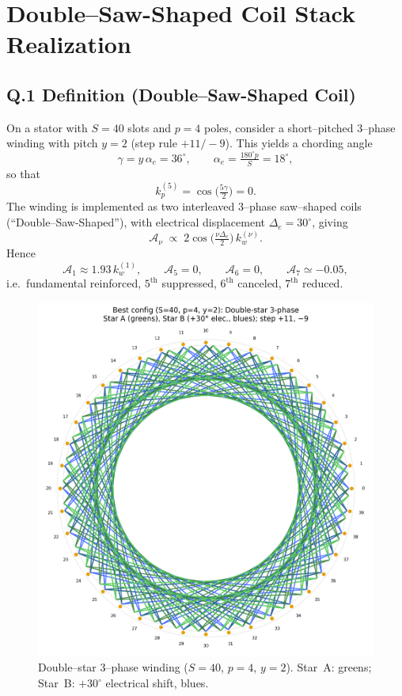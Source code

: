 \documentclass[12pt]{article}
\begin{document}
\section{Double--Saw-Shaped Coil Stack Realization}
    \label{sec:double-saw-stack}

    \subsection*{Q.1 Definition (Double--Saw-Shaped Coil)}
        On a stator with $S=40$ slots and $p=4$ poles, consider a short--pitched
        3--phase winding with pitch $y=2$ (step rule $+11/-9$).
        This yields a chording angle
        \[
            \gamma = y\,\alpha_e = 36^\circ,
            \qquad
            \alpha_e = \tfrac{180^\circ p}{S} = 18^\circ,
        \]
        so that
        \[
            k_p^{(5)}=\cos\!\big(\tfrac{5\gamma}{2}\big)=0.
        \]
        The winding is implemented as two interleaved 3--phase saw--shaped coils
        (``Double--Saw-Shaped''), with electrical displacement $\Delta_e=30^\circ$, giving
        \[
            \mathcal A_\nu \;\propto\;
            2\cos\!\Big(\tfrac{\nu\Delta_e}{2}\Big)\,k_w^{(\nu)}.
        \]
        Hence
        \[
            \mathcal A_1 \approx 1.93\,k_w^{(1)},\qquad
            \mathcal A_5=0,\qquad
            \mathcal A_6=0,\qquad
            \mathcal A_7\simeq -0.05,
        \]
        i.e.\ fundamental reinforced, $5^{\mathrm{th}}$ suppressed, $6^{\mathrm{th}}$ canceled,
        $7^{\mathrm{th}}$ reduced.

        \begin{figure}[htbp]
        \centering
        \includegraphics[width=0.7\linewidth]{S40_double_star_best}
        \caption{Double--star 3--phase winding ($S=40$, $p=4$, $y=2$).
        Star~A: greens; Star~B: $+30^\circ$ electrical shift, blues.}
        \label{fig:s40-double-star-best}
        \end{figure}
\end{document}
